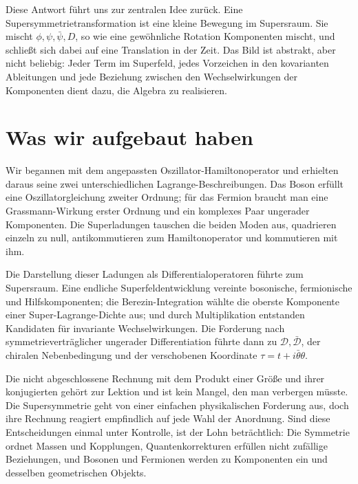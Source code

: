 Diese Antwort führt uns zur zentralen Idee zurück. Eine Supersymmetrietransformation ist eine kleine Bewegung im Supersraum. Sie mischt \(\phi,\psi,\bar\psi,D\), so wie eine gewöhnliche Rotation Komponenten mischt, und schließt sich dabei auf eine Translation in der Zeit. Das Bild ist abstrakt, aber nicht beliebig: Jeder Term im Superfeld, jedes Vorzeichen in den kovarianten Ableitungen und jede Beziehung zwischen den Wechselwirkungen der Komponenten dient dazu, die Algebra zu realisieren.

\section{Was wir aufgebaut haben}

Wir begannen mit dem angepassten Oszillator-Hamiltonoperator und erhielten daraus seine zwei unterschiedlichen Lagrange-Beschreibungen. Das Boson erfüllt eine Oszillatorgleichung zweiter Ordnung; für das Fermion braucht man eine Grassmann-Wirkung erster Ordnung und ein komplexes Paar ungerader Komponenten. Die Superladungen tauschen die beiden Moden aus, quadrieren einzeln zu null, antikommutieren zum Hamiltonoperator und kommutieren mit ihm.

Die Darstellung dieser Ladungen als Differentialoperatoren führte zum Supersraum. Eine endliche Superfeldentwicklung vereinte bosonische, fermionische und Hilfskomponenten; die Berezin-Integration wählte die oberste Komponente einer Super-Lagrange-Dichte aus; und durch Multiplikation entstanden Kandidaten für invariante Wechselwirkungen. Die Forderung nach symmetrieverträglicher ungerader Differentiation führte dann zu \(\mathcal D,\bar{\mathcal D}\), der chiralen Nebenbedingung und der verschobenen Koordinate \(\tau=t+i\bar\theta\theta\).

Die nicht abgeschlossene Rechnung mit dem Produkt einer Größe und ihrer konjugierten gehört zur Lektion und ist kein Mangel, den man verbergen müsste. Die Supersymmetrie geht von einer einfachen physikalischen Forderung aus, doch ihre Rechnung reagiert empfindlich auf jede Wahl der Anordnung. Sind diese Entscheidungen einmal unter Kontrolle, ist der Lohn beträchtlich: Die Symmetrie ordnet Massen und Kopplungen, Quantenkorrekturen erfüllen nicht zufällige Beziehungen, und Bosonen und Fermionen werden zu Komponenten ein und desselben geometrischen Objekts.
